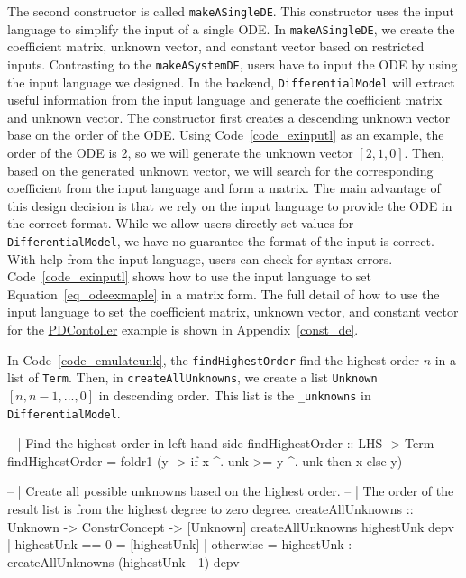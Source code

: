 The second constructor is called \verb|makeASingleDE|. This constructor uses the input language to simplify the input of a single ODE. In \verb|makeASingleDE|, we create the coefficient matrix, unknown vector, and constant vector based on restricted inputs. Contrasting to the \verb|makeASystemDE|, users have to input the ODE by using the input language we designed. In the backend, \verb|DifferentialModel| will extract useful information from the input language and generate the coefficient matrix and unknown vector. The constructor first creates a descending unknown vector base on the order of the ODE. Using Code~\ref{code_exinputl} as an example, the order of the ODE is 2, so we will generate the unknown vector $[2, 1, 0]$. Then, based on the generated unknown vector, we will search for the corresponding coefficient from the input language and form a matrix. The main advantage of this design decision is that we rely on the input language to provide the ODE in the correct format. While we allow users directly set values for \verb|DifferentialModel|, we have no guarantee the format of the input is correct. With help from the input language, users can check for syntax errors. Code~\ref{code_exinputl} shows how to use the input language to set Equation~\ref{eq_odeexmaple} in a matrix form. The full detail of how to use the input language to set the coefficient matrix, unknown vector, and constant vector for the \href{https://jacquescarette.github.io/Drasil/examples/pdcontroller/SRS/srs/PDController_SRS.html}{PDContoller} example is shown in Appendix~\ref{const_de}.

In Code~\ref{code_emulateunk}, the \verb|findHighestOrder| find the highest order $n$ in a list of \verb|Term|. Then, in \verb|createAllUnknowns|, we create a list \verb|Unknown| $[n, n-1, ..., 0]$ in descending order. This list is the \verb|_unknowns| in \verb|DifferentialModel|.

\begin{listing}[ht]
\begin{haskell1}
-- | Find the highest order in left hand side
findHighestOrder :: LHS -> Term
findHighestOrder = foldr1 (\x y -> if x ^. unk >= y ^. unk then x else y)

-- | Create all possible unknowns based on the highest order.
-- | The order of the result list is from the highest degree to zero degree.
createAllUnknowns :: Unknown -> ConstrConcept -> [Unknown]
createAllUnknowns highestUnk depv
  | highestUnk  == 0  = [highestUnk]
  | otherwise = highestUnk : createAllUnknowns (highestUnk - 1) depv
\end{haskell1}
\label{code_emulateunk}
\end{listing}

